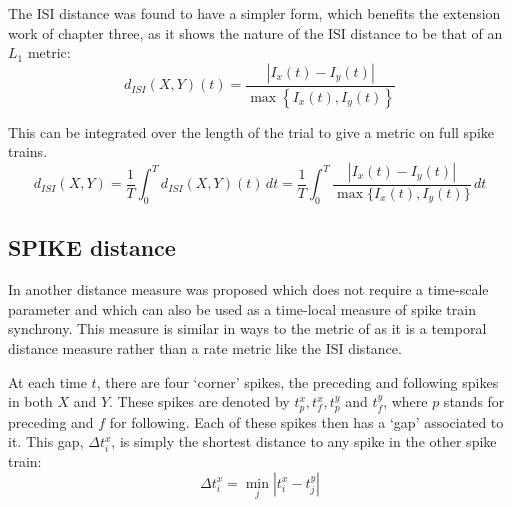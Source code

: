 The ISI distance was found to have a simpler form, which benefits the extension work of chapter three, as it shows the nature of the ISI distance to be that of an $L_1$ metric:
\begin{equation}
d_{ISI}(X,Y)(t) = \frac{| I_x(t) - I_y(t) |}{\max \left\{ I_x(t), I_y(t)\right\}}
\end{equation}

This can be integrated over the length of the trial to give a metric on full spike trains.
\begin{equation}
d_{ISI}(X,Y) = \frac{1}{T}\int_0^T d_{ISI}(X,Y)(t)\,dt = \frac{1}{T}\int_0^T \frac{| I_x(t) - I_y(t) |}{\max \{I_x(t),I_y(t)\}}\, dt
\end{equation}


\subsection{SPIKE distance}
In \citep{KreuzEtAl2011a,KreuzEtAl2012a} another distance measure was proposed which does not require a time-scale parameter and which can also be used as a time-local measure of spike train synchrony.  This measure is similar in ways to the metric of \citet{VictorPurpura1997a} as it is a temporal distance measure rather than a rate metric like the ISI distance.

At each time $t$, there are four \lq{}corner\rq{} spikes,  the preceding and following spikes in both $X$ and $Y$. These spikes are denoted by $t^x_p, t^x_f, t^y_p$ and $t^y_f$, where $p$ stands for preceding and $f$ for following.  Each of these spikes then has a \lq{}gap\rq{} associated to it.  This gap, $\Delta t^x_i$, is simply the shortest distance to any spike in the other spike train:
\begin{equation}
\Delta t^x_i = \min_j | t^x_i - t^y_j |
\end{equation}

